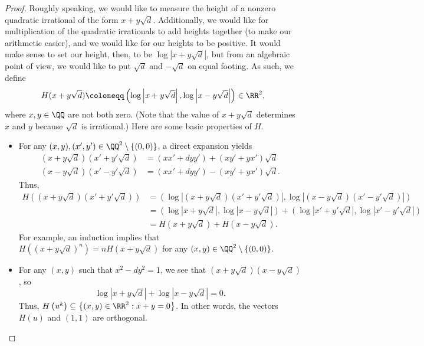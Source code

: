 \documentclass[../notes.tex]{subfiles}
\begin{document}
\begin{proof}
	Roughly speaking, we would like to measure the height of a nonzero quadratic irrational of the form $x+y\sqrt d$. Additionally, we would like for multiplication of the quadratic irrationals to add heights together (to make our arithmetic easier), and we would like for our heights to be positive. It would make sense to set our height, then, to be $\log\left|x+y\sqrt d\right|$, but from an algebraic point of view, we would like to put $\sqrt d$ and $-\sqrt d$ on equal footing. As such, we define
	\[H(x+y\sqrt d)\coloneqq\left(\log\left|x+y\sqrt d\right|,\log\left|x-y\sqrt d\right|\right)\in\RR^2,\]
	where $x,y\in\QQ$ are not both zero. (Note that the value of $x+y\sqrt d$ determines $x$ and $y$ because $\sqrt d$ is irrational.) Here are some basic properties of $H$.
	\begin{itemize}
		\item For any $(x,y),(x',y')\in\QQ^2\setminus\{(0,0)\}$, a direct expansion yields
		\begin{align*}
			\left(x+y\sqrt d\right)\left(x'+y'\sqrt d\right) &= (xx'+dyy')+(xy'+yx')\sqrt d \\
			\left(x-y\sqrt d\right)\left(x'-y'\sqrt d\right) &= (xx'+dyy')-(xy'+yx')\sqrt d.
		\end{align*}
		Thus,
		\begin{align*}
			H\left((x+y\sqrt d)(x'+y'\sqrt d)\right) &= \left(\log\left|(x+y\sqrt d)(x'+y'\sqrt d)\right|,\log\left|(x-y\sqrt d)(x'-y'\sqrt d)\right|\right) \\
			&= \left(\log\left|x+y\sqrt d\right|,\log\left|x-y\sqrt d\right|\right)+\left(\log\left|x'+y'\sqrt d\right|,\log\left|x'-y'\sqrt d\right|\right) \\
			&= H(x+y\sqrt d)+H(x-y\sqrt d).
		\end{align*}
		For example, an induction implies that $H\left((x+y\sqrt d)^n\right)=nH(x+y\sqrt d)$ for any $(x,y)\in\QQ^2\setminus\{(0,0)\}$.
		\item For any $(x,y)$ such that $x^2-dy^2=1$, we see that $(x+y\sqrt d)(x-y\sqrt d)$, so
		\[\log\left|x+y\sqrt d\right|+\log\left|x-y\sqrt d\right|=0.\]
		Thus, $H\left(u^k\right)\subseteq\left\{(x,y)\in\RR^2:x+y=0\right\}$. In other words, the vectors $H(u)$ and $(1,1)$ are orthogonal.


\end{itemize}
\end{proof}
\end{document}
